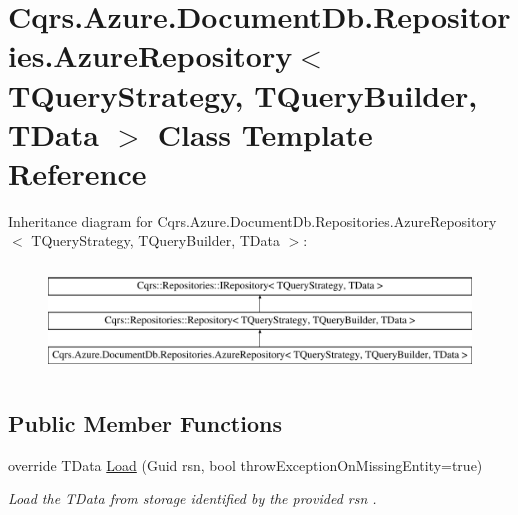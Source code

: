 \hypertarget{classCqrs_1_1Azure_1_1DocumentDb_1_1Repositories_1_1AzureRepository}{}\section{Cqrs.\+Azure.\+Document\+Db.\+Repositories.\+Azure\+Repository$<$ T\+Query\+Strategy, T\+Query\+Builder, T\+Data $>$ Class Template Reference}
\label{classCqrs_1_1Azure_1_1DocumentDb_1_1Repositories_1_1AzureRepository}
Inheritance diagram for Cqrs.\+Azure.\+Document\+Db.\+Repositories.\+Azure\+Repository$<$ T\+Query\+Strategy, T\+Query\+Builder, T\+Data $>$\+:\begin{figure}[H]
\begin{center}
\leavevmode
\includegraphics[height=2.901554cm]{classCqrs_1_1Azure_1_1DocumentDb_1_1Repositories_1_1AzureRepository}
\end{center}
\end{figure}
\subsection*{Public Member Functions}
\begin{DoxyCompactItemize}
\item 
override T\+Data \hyperlink{classCqrs_1_1Azure_1_1DocumentDb_1_1Repositories_1_1AzureRepository_a22c58163e101a6cb80f891bed6114380_a22c58163e101a6cb80f891bed6114380}{Load} (Guid rsn, bool throw\+Exception\+On\+Missing\+Entity=true)
\begin{DoxyCompactList}\small\item\em Load the {\itshape T\+Data}  from storage identified by the provided {\itshape rsn} . \end{DoxyCompactList}\end{DoxyCompactItemize}
